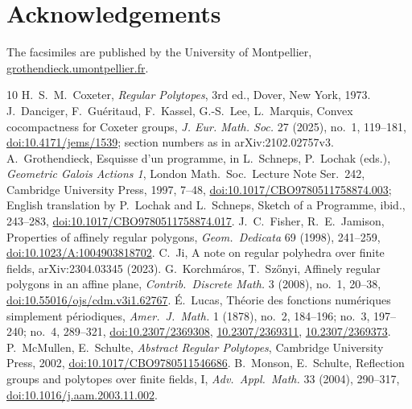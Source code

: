 \documentclass[11pt,a4paper]{amsart}
\theoremstyle{definition}
\theoremstyle{remark}
\begin{document}
\section*{Acknowledgements}
The facsimiles are published by the University of Montpellier, \href{https://grothendieck.umontpellier.fr/}{grothendieck.umontpellier.fr}.

\begin{thebibliography}{10}
 H.~S.~M.~Coxeter, \emph{Regular Polytopes}, 3rd ed., Dover, New York, 1973.
 J.~Danciger, F.~Guéritaud, F.~Kassel, G.-S.~Lee, L.~Marquis, Convex cocompactness for Coxeter groups, \emph{J. Eur. Math. Soc.} 27 (2025), no.~1, 119--181, \href{https://doi.org/10.4171/jems/1539}{doi:10.4171/jems/1539}; section numbers as in arXiv:2102.02757v3.
 A.~Grothendieck, Esquisse d'un programme, in L.~Schneps, P.~Lochak (eds.), \emph{Geometric Galois Actions 1}, London Math.\ Soc.\ Lecture Note Ser.~242, Cambridge University Press, 1997, 7--48, \href{https://doi.org/10.1017/CBO9780511758874.003}{doi:10.1017/CBO9780511758874.003}; English translation by P.~Lochak and L.~Schneps, Sketch of a Programme, ibid., 243--283, \href{https://doi.org/10.1017/CBO9780511758874.017}{doi:10.1017/CBO9780511758874.017}.
 J.~C.~Fisher, R.~E.~Jamison, Properties of affinely regular polygons, \emph{Geom.\ Dedicata} 69 (1998), 241--259, \href{https://doi.org/10.1023/A:1004903818702}{doi:10.1023/A:1004903818702}.
 C.~Ji, A note on regular polyhedra over finite fields, arXiv:2304.03345 (2023).
 G.~Korchmáros, T.~Sz\H{o}nyi, Affinely regular polygons in an affine plane, \emph{Contrib.\ Discrete Math.} 3 (2008), no.~1, 20--38, \href{https://doi.org/10.55016/ojs/cdm.v3i1.62767}{doi:10.55016/ojs/cdm.v3i1.62767}.
 É.~Lucas, Théorie des fonctions numériques simplement périodiques, \emph{Amer.\ J.\ Math.} 1 (1878), no.~2, 184--196; no.~3, 197--240; no.~4, 289--321, \href{https://doi.org/10.2307/2369308}{doi:10.2307/2369308}, \href{https://doi.org/10.2307/2369311}{10.2307/2369311}, \href{https://doi.org/10.2307/2369373}{10.2307/2369373}.
 P.~McMullen, E.~Schulte, \emph{Abstract Regular Polytopes}, Cambridge University Press, 2002, \href{https://doi.org/10.1017/CBO9780511546686}{doi:10.1017/CBO9780511546686}.
 B.~Monson, E.~Schulte, Reflection groups and polytopes over finite fields, I, \emph{Adv.\ Appl.\ Math.} 33 (2004), 290--317, \href{https://doi.org/10.1016/j.aam.2003.11.002}{doi:10.1016/j.aam.2003.11.002}.
\end{thebibliography}
\end{document}
